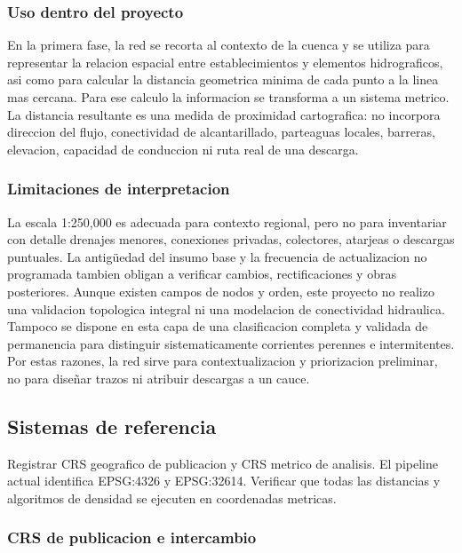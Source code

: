 \documentclass[11pt,letterpaper]{article}
\begin{document}
\subsubsection*{Uso dentro del proyecto}

En la primera fase, la red se recorta al contexto de la cuenca y se utiliza para representar la relacion espacial entre establecimientos y elementos hidrograficos, asi como para calcular la distancia geometrica minima de cada punto a la linea mas cercana. Para ese calculo la informacion se transforma a un sistema metrico. La distancia resultante es una medida de proximidad cartografica: no incorpora direccion del flujo, conectividad de alcantarillado, parteaguas locales, barreras, elevacion, capacidad de conduccion ni ruta real de una descarga.

\subsubsection*{Limitaciones de interpretacion}

La escala 1:250,000 es adecuada para contexto regional, pero no para inventariar con detalle drenajes menores, conexiones privadas, colectores, atarjeas o descargas puntuales. La antigüedad del insumo base y la frecuencia de actualizacion no programada tambien obligan a verificar cambios, rectificaciones y obras posteriores. Aunque existen campos de nodos y orden, este proyecto no realizo una validacion topologica integral ni una modelacion de conectividad hidraulica. Tampoco se dispone en esta capa de una clasificacion completa y validada de permanencia para distinguir sistematicamente corrientes perennes e intermitentes. Por estas razones, la red sirve para contextualizacion y priorizacion preliminar, no para diseñar trazos ni atribuir descargas a un cauce.

\subsection{Sistemas de referencia}
\begin{evidencia}
Registrar CRS geografico de publicacion y CRS metrico de analisis. El pipeline actual identifica EPSG:4326 y EPSG:32614. Verificar que todas las distancias y algoritmos de densidad se ejecuten en coordenadas metricas.
\end{evidencia}

\subsubsection*{CRS de publicacion e intercambio}
\end{document}
